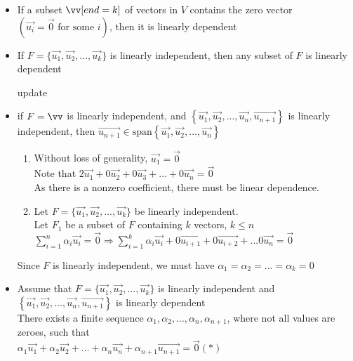 \documentclass[12pt]{article}
\renewcommand{\v}[1]{\overrightarrow{#1}}
\newcommand{\vectorset}[1]{\{\v{#1_1}, \v{#1_2}, ..., \v{#1_k}\}}
\newenvironment{proof}{\block[Proof]}{\endblock}
\newcommand{\todo}[0]{\text{\textcolor{red}{\textbackslash\textbackslash TODO \ }}}
\newcommand{\bb}[1]{\left\{#1\right\}}
\newcommand{\pp}[1]{\left(#1\right)}
\newcommand{\sspan}[1]{\text{span}\bb{#1}}
\begin{document}
\begin{itemize}
	\item If a subset $\vv[end=k]$ of vectors in $V$ contains the zero vector $\pp{\v{u_i} = \v{0} \text{ for some } i}$, then it is linearly dependent
	
	\item If $F = \vectorset{u}$ is linearly independent, then any subset of $F$ is linearly dependent
	
	
	\todo update
	\item if $F = \vv$ is linearly independent, and $\bb{\v{u_1}, \v{u_2}, ..., \v{u_n}, \v{u_{n+1}}}$ is linearly independent, then $\v{u_{n+1}} \in \sspan{\v{u_1}, \v{u_2}, ..., \v{u_n}}$
	
	\begin{proof}
		\begin{enumerate}
			\item Without loss of generality, $\v{u_1} = \v{0}$ \\
			Note that $2 \v{u_1} + 0 \v{u_2} + 0 \v{u_3} + ... + 0 \v{u_n} = \v{0}$ \\
			As there is a nonzero coefficient, there must be linear dependence.
			
			\item Let $F = \vectorset{u}$ be linearly independent. \\
			Let $F_1$ be a subset of $F$ containing $k$ vectors, $k \le n$ \\
			$\sum_{i=1}^n \alpha_i \v{u_i} = \v{0} \Rightarrow \sum_{i=1}^k \alpha_i \v{u_i} + 0 \v{u_{i+1}} + 0 \v{u_{i+2}} + ... 0 \v{u_n} = \v{0}$
		\end{enumerate}
	\end{proof}

	Since $F$ is linearly independent, we must have $\alpha_1 = \alpha_2 = ... = \alpha_k = 0$

	\item Assume that $F = \vectorset{u}$ is linearly independent and $\bb{\v{u_1}, \v{u_2}, ..., \v{u_n}, \v{u_{n+1}}}$ is linearly dependent \\
	
	There exists a finite sequence $\alpha_1, \alpha_2, ..., \alpha_n, \alpha_{n+1}$, where not all values are zeroes, such that \\
	$\alpha_1 \v{u_1} + \alpha_2 \v{u_2} + ... + \alpha_n \v{u_n} + \alpha_{n+1} \v{u_{n+1}} = \v{0}(*)$ \\
	

\end{itemize}
\end{document}
